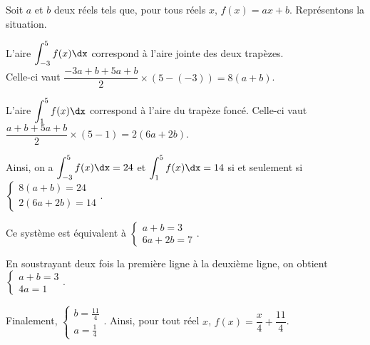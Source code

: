 \documentclass[11pt,fleqn, openany]{book} %
\begin{document}
\begin{solution}
Soit \(a\) et \(b\) deux réels tels que, pour tous réels  \(x\), \(f(x)=ax+b\). Représentons la situation.


\begin{center}
\end{center}

L'aire \(\displaystyle\int_{-3}^5 f(x)\dx\) correspond à l'aire jointe des deux trapèzes. \\ Celle-ci vaut \(\dfrac{-3a+b+5a+b}{2} \times (5-(-3))=8(a+b)\).

L'aire \(\displaystyle\int_{1}^5 f(x)\dx\) correspond à l'aire du trapèze foncé. Celle-ci vaut \(\dfrac{a+b+5a+b}{2} \times (5-1)=2(6a+2b)\).

Ainsi, on a \(\displaystyle\int_{-3}^5 f(x)\dx=24\) et \(\displaystyle\int_{1}^5 f(x)\dx=14\) si et seulement si  \(\left\{\begin{array}{l} 8(a+b) = 24 \\ 2(6a+2b)=14\end{array}\right.\).

Ce système est équivalent à \(\left\{\begin{array}{l} a+b = 3 \\ 6a+2b=7\end{array}\right.\).

En soustrayant deux fois la première ligne à la deuxième ligne, on obtient \(\left\{\begin{array}{l} a+b = 3 \\ 4a=1\end{array}\right.\).

Finalement, \(\left\{\begin{array}{l} b = \frac{11}{4} \\ a=\frac{1}{4}\end{array}\right.\). Ainsi, pour tout réel \(x\), \(f(x)=\dfrac{x}{4}+\dfrac{11}{4}\).

\end{solution}
\end{document}

